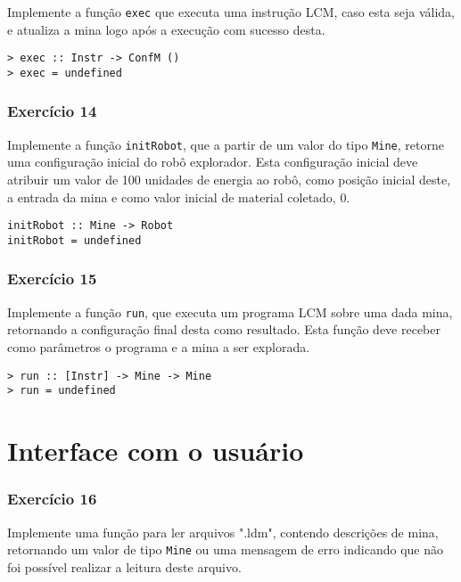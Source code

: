 \documentclass[a4paper]{article}
\begin{document}
Implemente a função \texttt{exec} que executa uma instrução LCM, caso esta seja válida, e
atualiza a mina logo após a execução com sucesso desta.

\begin{verbatim}
> exec :: Instr -> ConfM ()
> exec = undefined
\end{verbatim}

\subsubsection{Exercício 14}
\label{sec:orgf1dd133}

Implemente a função \texttt{initRobot}, que a partir de um valor do tipo
\texttt{Mine}, retorne uma configuração inicial do robô explorador. Esta configuração inicial
deve atribuir um valor de 100 unidades de energia ao robô, como posição inicial deste, a
entrada da mina e como valor inicial de material coletado, 0.

\begin{verbatim}
initRobot :: Mine -> Robot
initRobot = undefined
\end{verbatim}

\subsubsection{Exercício 15}
\label{sec:org6c5d7c9}

Implemente a função \texttt{run}, que executa um programa LCM sobre uma
dada mina, retornando a configuração final desta como resultado.
Esta função deve receber como parâmetros o programa e a mina a ser explorada.

\begin{verbatim}
> run :: [Instr] -> Mine -> Mine
> run = undefined
\end{verbatim}

\section{Interface com o usuário}
\label{sec:orga7fa3ea}

\subsubsection{Exercício 16}
\label{sec:orgb42d073}

Implemente uma função para ler arquivos ".ldm", contendo descrições
de mina, retornando um valor de tipo \texttt{Mine} ou uma mensagem de erro indicando que
não foi possível realizar a leitura deste arquivo.
\end{document}
